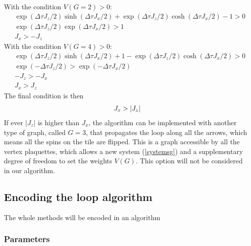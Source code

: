 \documentclass[a4paper,12pt,twoside]{article}
\begin{document}
	With the condition $V(G=2) > 0$:
	\begin{equation}
		\begin{split}
		&\exp(\Delta \tau J_{z}/2)\sinh(\Delta\tau J_{x}/2) + \exp(\Delta \tau J_{z}/2)\cosh(\Delta\tau J_{x}/2) - 1  > 0 \\
		&\exp(\Delta \tau J_{z}/2)\exp(\Delta\tau J_{x}/2)  > 1\\
		&J_{x} > - J_{z}
		\end{split}
	\end{equation}
	With the condition $V(G=4) > 0$:
	\begin{equation}
		\begin{split}
		&\exp(\Delta \tau J_{z}/2)\sinh(\Delta\tau J_{x}/2) + 1 - \exp(\Delta \tau J_{z}/2)\cosh(\Delta\tau J_{x}/2) > 0 \\
		&\exp(- \Delta \tau J_{z}/2)  > \exp(- \Delta\tau J_{x}/2)\\
		&- J_{z} > - J_{x}\\
		& J_{x} > J_{z}
		\end{split}
	\end{equation}
	The final condition is then
	\begin{equation}
		\centering
		J_{x} > |J_{z}|
	\end{equation}
	If ever $|J_{z}|$ is higher than $J_{x}$, the algorithm can be implemented with another type of graph, called $G = 3$, that propagates the loop along all the arrows, which means all the spins on the tile are flipped. This is a graph accessible by all the vertex plaquettes, which allows a new system (\ref{systemsg}) and a supplementary degree of freedom to set the weights $V(G)$. This option will not be considered in our algorithm.
	
	\subsection{Encoding the loop algorithm}
	The whole methods will be encoded in an algorithm
	
	\subsubsection{Parameters}
	
\end{document}
